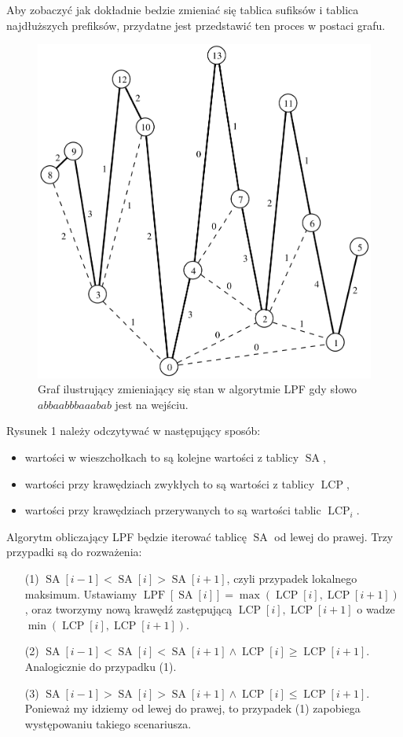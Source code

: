\documentclass[a4paper,12pt]{article}
\theoremstyle{definition}
\DeclareMathOperator{\SA}{SA}
\DeclareMathOperator{\LCP}{LCP}
\DeclareMathOperator{\LPF}{LPF}
\begin{document}
Aby zobaczyć jak dokładnie bedzie zmieniać się tablica sufiksów i tablica najdłuższych prefiksów,
 przydatne jest przedstawić ten proces w postaci grafu.

\begin{figure}[h!]
  \center
  \includegraphics[width=0.6\linewidth]{graph}
  \caption{Graf ilustrujący zmieniający się stan w algorytmie LPF gdy słowo $abbaabbbaaabab$ jest na wejściu.}
\end{figure}

Rysunek 1 należy odczytywać w następujący sposób:
\begin{itemize}
\item wartości w wieszchołkach to są kolejne wartości z tablicy $\SA$,
\item wartości przy krawędziach zwykłych to są wartości z tablicy $\LCP$,
\item wartości przy krawędziach przerywanych to są wartości tablic $\LCP_{i}$.
\end{itemize}

Algorytm obliczający LPF będzie iterować tablicę $\SA$ od lewej do prawej.
Trzy przypadki są do rozważenia:

\begin{enumerate}
\item[(1)] $\SA[i - 1] < \SA[i] > \SA[i + 1]$, czyli przypadek lokalnego maksimum.
  Ustawiamy $\LPF[\SA[i]] = \max(\LCP[i], \LCP[i + 1])$, oraz
  tworzymy nową krawędź zastępującą $\LCP[i], \LCP[i + 1]$ o wadze $\min(\LCP[i], \LCP[i + 1])$.
\item[(2)] $\SA[i - 1] < \SA[i] < \SA[i + 1] \land \LCP[i] \geq \LCP[i + 1]$.
  Analogicznie do przypadku (1).
\item[(3)] $\SA[i - 1] > \SA[i] > \SA[i + 1] \land \LCP[i] \leq \LCP[i + 1]$.
  Ponieważ my idziemy od lewej do prawej, to przypadek (1) zapobiega występowaniu takiego scenariusza.
\end{enumerate}
\end{document}
